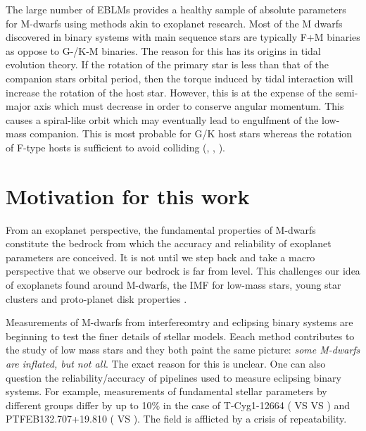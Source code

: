 The large number of EBLMs provides a healthy sample of absolute parameters for M-dwarfs using methods akin to exoplanet research. Most of the M dwarfs discovered in binary systems with main sequence stars are typically F+M binaries as oppose to G-/K-M binaries. The reason for this has its origins in tidal evolution theory. If the rotation of the primary star is less than that of the companion stars orbital period, then the torque induced by tidal interaction will increase the rotation of the host star. However, this is at the expense of the semi-major axis which must decrease in order to conserve angular momentum. This causes a spiral-like orbit which may eventually lead to engulfment of the low-mass companion.  This is most probable for G/K host stars whereas the rotation of F-type hosts is sufficient to avoid colliding (\citealt{2017IAUS..328..308P}, \citealt{2011A&A...525A..68B}, \citealt{2011A&A...533A..83B}). 

\section{Motivation for this work}

From an exoplanet perspective, the fundamental properties of M-dwarfs constitute the bedrock from which the accuracy and reliability of exoplanet parameters are conceived. It is not until we step back and take a macro perspective that we observe our bedrock is far from level. This challenges our idea of exoplanets found around M-dwarfs, the IMF for low-mass stars, young star clusters and proto-planet disk properties \citep{2013ApJ...771..129A}.

Measurements of M-dwarfs from interfereomtry and eclipsing binary systems are beginning to test the finer details of stellar models. Eeach method contributes to the study of low mass stars and they both paint the same picture: \textit{some M-dwarfs are inflated, but not all}. The exact reason for this is unclear. One can also question the reliability/accuracy of pipelines used to measure eclipsing binary systems. For example, measurements of fundamental stellar parameters by different groups differ by up to 10\% in the case of T-Cyg1-12664 (\citealt{2013MNRAS.429...85C} VS \citealt{2017A&A...600A..55I} VS \citealt{2017AJ....154..100H}) and PTFEB132.707+19.810  (\citealt{2017ApJ...845...72K} VS \citealt{2017ApJ...849...11G}). The field is afflicted by a crisis of repeatability. 

